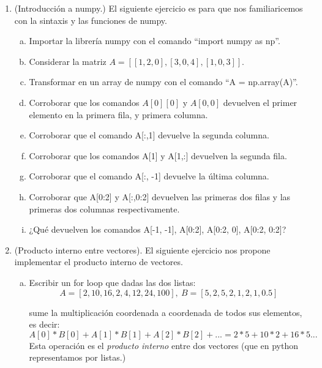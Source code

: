 \documentclass[12pt]{article}
\begin{document}
\begin{center}
\begin{enumerate}
            \item 
            (Introducción a numpy.) El siguiente ejercicio es para que nos familiaricemos con la sintaxis y las funciones de numpy.
            \begin{enumerate}[a)]
                \item Importar la librería numpy con el comando “import numpy as np”.
                \item Considerar la matriz
                $A = [[1, 2, 0],
                [3, 0, 4],
                [1, 0, 3]]$.
                \item Transformar en un array de numpy con el comando “A = np.array(A)”.
                \item Corroborar que los comandos $A[0][0]$ y $A[0, 0]$ devuelven el primer elemento en la
                primera fila, y primera columna.
                \item Corroborar que el comando A[:,1] devuelve la segunda columna.
                \item Corroborar que los comandos A[1] y A[1,:] devuelven la segunda fila.
                \item Corroborar que el comando A[:, -1] devuelve la última columna.
                \item Corroborar que A[0:2] y A[:,0:2] devuelven las primeras dos filas y las primeras dos
                columnas respectivamente.
                \item ¿Qué devuelven los comandos A[-1, -1], A[0:2], A[0:2, 0], A[0:2, 0:2]?
            \end{enumerate}
            
            \item (Producto interno entre vectores).
                El siguiente ejercicio nos propone implementar el producto interno de vectores.
                \begin{enumerate}[a)]
                    \item Escribir un for loop que dadas las dos listas:
                    \[
                        A = [2, 10, 16, 2, 4, 12, 24, 100],  \ 
                        B = [5, 2, 5, 2, 1, 2, 1, 0.5]
                    \]
                    
                    sume la multiplicación coordenada a coordenada de todos sus elementos, es decir:
                    \[
                        A[0]*B[0] + A[1]*B[1] + A[2]*B[2] + ... = 2*5 + 10*2 + 16*5 ...
                    \]
                    Esta operación es el \emph{producto interno} entre dos vectores (que en python representamos por listas.)


\end{enumerate}
\end{enumerate}
\end{center}
\end{document}
